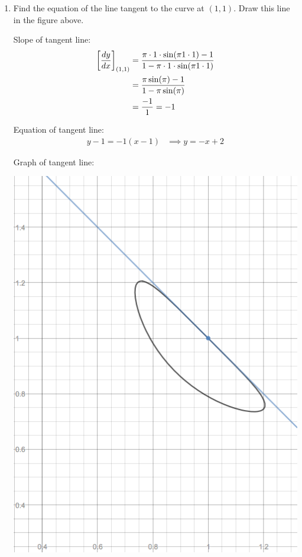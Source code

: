 \documentclass[nooutcomes,handout]{ximera}
\begin{document}
\begin{problem}
\begin{enumerate}
    \item
      Find the equation of the line tangent to the curve at $(1,1)$.
      Draw this line in the figure above.
      \begin{freeResponse}
        Slope of tangent line:
        \begin{align*}
          \eval{\dd[y]{x}}_{(1,1)} &= \frac{\pi \cdot 1 \cdot\sin(\pi 1 \cdot 1) - 1}{1 - \pi \cdot 1 \cdot \sin(\pi 1 \cdot 1)} \\
          &= \frac{\pi\sin(\pi) - 1}{1 - \pi \sin(\pi)}\\
          &= \frac{-1}{1} = -1
        \end{align*}

        Equation of tangent line:
        \begin{align*}
          y - 1 = -1(x - 1) &\implies y = -x + 2
        \end{align*}

        Graph of tangent line:
        \begin{image}
          \includegraphics[scale = 0.5]{figure5.png}
        \end{image}
      \end{freeResponse}

  \end{enumerate}
\end{problem}
\end{document}
